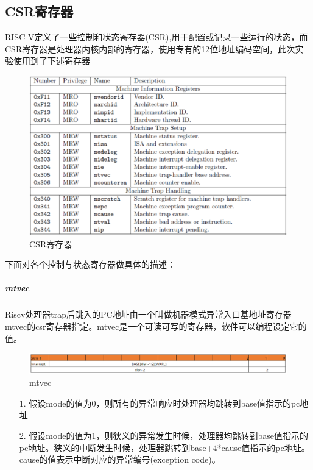 \subsection{CSR寄存器}
RISC-V定义了一些控制和状态寄存器(CSR),用于配置或记录一些运行的状态，而CSR寄存器是处理器内核内部的寄存器，使用专有的12位地址编码空间，此次实验使用到了下述寄存器

\begin{figure}[H] %
    \centering %
    \includegraphics[width=1.0\textwidth]{figs/csrregs.png} %
    \caption{CSR寄存器} %
    \label{Fig.2} %
\end{figure}

下面对各个控制与状态寄存器做具体的描述：
\subparagraph{mtvec}
Riscv处理器trap后跳入的PC地址由一个叫做机器模式异常入口基地址寄存器mtvec的csr寄存器指定。mtvec是一个可读可写的寄存器，软件可以编程设定它的值。

\begin{figure}[H] %
    \centering %
    \includegraphics[width=1.0\textwidth]{figs/mtvec.png} %
    \caption{mtvec} %
    \label{Fig.3} %
\end{figure}

\begin{itemize}
    \item [1.] 假设mode的值为0，则所有的异常响应时处理器均跳转到base值指示的pc地址
    \item [2.] 假设mode的值为1，则狭义的异常发生时候，处理器均跳转到base值指示的pc地址。狭义的中断发生时候，处理器跳转到base+4*cause值指示的pc地址。cause的值表示中断对应的异常编号(exception code)。
\end{itemize}

